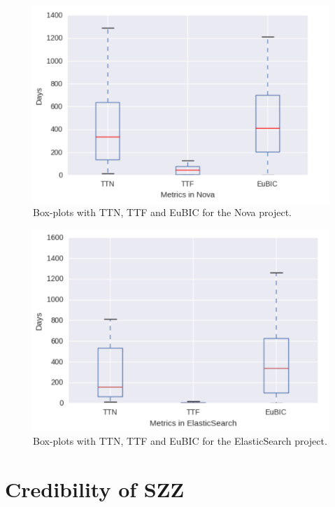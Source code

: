 \documentclass[10pt, conference]{IEEEtran}
\begin{document}
\begin{figure}[ht]
\centering
\includegraphics[width=\columnwidth]{boxplotNova.png}
\caption{Box-plots with TTN, TTF and EuBIC for the Nova project.}
\label{fig:meansOfNova}       %
\end{figure}

\begin{figure}[ht]
\centering
\includegraphics[width=\columnwidth]{boxplotES.png}
\caption{Box-plots with TTN, TTF and EuBIC for the ElasticSearch project.}
\label{fig:meansOfES}       %
\end{figure}

\section{Credibility of SZZ}
\label{sec:Validation}
\end{document}
